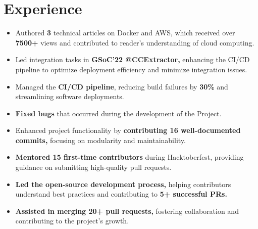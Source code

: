 \documentclass[]{deedy-resume-openfont}
\begin{document}
\begin{minipage}[t]{0.66\textwidth} 

\section{Experience}
\vspace{\topsep}
\begin{itemize}[leftmargin=*]
    \item Authored \textbf{3} technical articles on Docker and AWS, which received over \textbf{7500+} views and contributed to reader's understanding of cloud computing.
\end{itemize}

\sectionsep

\begin{itemize}[leftmargin=*]
    \item Led integration tasks in \textbf{GSoC'22 @CCExtractor,} enhancing the CI/CD pipeline to optimize deployment efficiency and minimize integration issues.
    \vspace{-2.3mm} %
    \item Managed the \textbf{CI/CD pipeline}, reducing build failures by \textbf{30\%} and streamlining software deployments.
    \vspace{-2.3mm}
    \item \textbf{Fixed bugs} that occurred during the development of the Project.
    \vspace{-2.3mm}
    \item Enhanced project functionality by \textbf{contributing 16 well-documented commits,} focusing on modularity and maintainability.
\end{itemize}

\sectionsep

\begin{itemize}[leftmargin=*]
    \item \textbf{Mentored 15 first-time contributors} during Hacktoberfest, providing guidance on submitting high-quality pull requests.
    \vspace{-2.3mm} %
    \item \textbf{Led the open-source development process,} helping contributors understand best practices and contributing to \textbf{5+ successful PRs.}
    \vspace{-2.3mm}
    \item \textbf{Assisted in merging 20+ pull requests,} fostering collaboration and contributing to the project's growth.
\end{itemize}
\sectionsep


\end{minipage}
\end{document}

